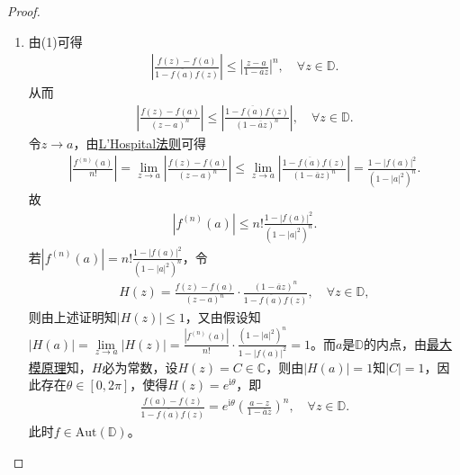 \documentclass[../../main.tex]{subfiles}%
\begin{document}
\begin{proof}
\begin{enumerate}[(1)]
\begin{align*}
g(z)&=z^n h(z)=e^{\mathrm{i}\theta}z^n\Longleftrightarrow \psi\circ f\circ \varphi(z)=e^{\mathrm{i}\theta}z^n\\
&\Longleftrightarrow \psi\circ f(z)=e^{\mathrm{i}\theta}\left(\varphi^{-1}(z)\right)^n=e^{\mathrm{i}\theta}\varphi^n(z)\\
&\Longleftrightarrow \frac{f(a)-f(z)}{1-\overline{f(a)}f(z)}=e^{\mathrm{i}\theta}\left(\frac{a-z}{1-\overline{a}z}\right)^n.
\end{align*}
此时$f\in\mathrm{Aut}(\mathbb{D})$。

\item  由(1)可得
\begin{align*}
\left|\frac{f(z)-f(a)}{1-\overline{f(a)}f(z)}\right|\leqslant \left|\frac{z-a}{1-\overline{a}z}\right|^n,\quad \forall z\in\mathbb{D}.
\end{align*}
从而
\begin{align*}
\left|\frac{f(z)-f(a)}{(z-a)^n}\right|\leqslant \left|\frac{1-\overline{f(a)}f(z)}{(1-\overline{a}z)^n}\right|,\quad \forall z\in\mathbb{D}.
\end{align*}
令$z\rightarrow a$，由\hyperref[theorem:解析函数一般形式的L'Hospital法则]{L'Hospital法则}可得
\begin{align*}
\left|\frac{f^{(n)}(a)}{n!}\right|=\lim\limits_{z\rightarrow a}\left|\frac{f(z)-f(a)}{(z-a)^n}\right|\leqslant\lim\limits_{z\rightarrow a}\left|\frac{1-\overline{f(a)}f(z)}{(1-\overline{a}z)^n}\right|=\frac{1-|f(a)|^2}{(1-|a|^2)^n}.
\end{align*}
故
\begin{align*}
|f^{(n)}(a)|\leqslant n!\frac{1-|f(a)|^2}{(1-|a|^2)^n}.
\end{align*}
若$|f^{(n)}(a)|=n!\frac{1-|f(a)|^2}{(1-|a|^2)^n}$，令
\begin{align*}
H(z)=\frac{f(z)-f(a)}{(z-a)^n}\cdot\frac{(1-\overline{a}z)^n}{1-\overline{f(a)}f(z)},\quad \forall z\in\mathbb{D},
\end{align*}
则由上述证明知$|H(z)|\leqslant 1$，又由假设知$|H(a)|=\lim\limits_{z\rightarrow a}|H(z)|=\frac{|f^{(n)}(a)|}{n!}\cdot\frac{(1-|a|^2)^n}{1-|f(a)|^2}=1$。而$a$是$\mathbb{D}$的内点，由\hyperref[theorem:最大模原理-定理4.5.1]{最大模原理}知，$H$必为常数，设$H(z)=C\in\mathbb{C}$，则由$|H(a)|=1$知$|C|=1$，因此存在$\theta\in[0,2\pi]$，使得$H(z)=e^{\mathrm{i}\theta}$，即
\begin{align*}
\frac{f(a)-f(z)}{1-\overline{f(a)}f(z)}=e^{\mathrm{i}\theta}\left(\frac{a-z}{1-\overline{a}z}\right)^n,\quad \forall z\in\mathbb{D}.
\end{align*}
此时$f\in\mathrm{Aut}(\mathbb{D})$。
\end{enumerate}
\end{proof}
\end{document}
